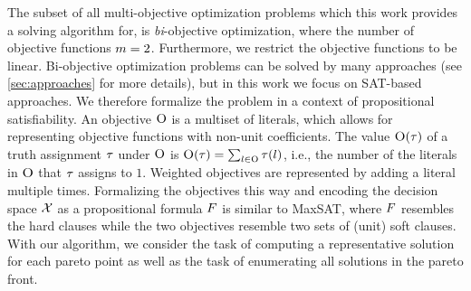 The subset of all multi-objective optimization problems which this work provides a solving algorithm for, is \emph{bi}-objective optimization, where the number of objective functions $m=2$.
Furthermore, we restrict the objective functions to be linear.
Bi-objective optimization problems can be solved by many approaches (see \cref{sec:approaches} for more details), but in this work we focus on SAT-based approaches.
We therefore formalize the problem in a context of propositional satisfiability.
An objective $\textsc{O}$ is a multiset of literals, which allows for representing objective functions with non-unit coefficients.
The value $\textsc{O}(\tau)$ of a truth assignment $\tau$ under $\textsc{O}$ is $\textsc{O}(\tau) = \sum_{l \in \textsc{O}} \tau(l)$, i.e., the number of the literals in $\textsc{O}$ that $\tau$ assigns to $1$. 
Weighted objectives are represented by adding a literal multiple times.
Formalizing the objectives this way and encoding the decision space $\mathcal{X}$ as a propositional formula $F$ is similar to MaxSAT, where $F$ resembles the hard clauses while the two objectives resemble two sets of (unit) soft clauses.
With our algorithm, we consider the task of computing a representative solution for each pareto point as well as the task of enumerating all solutions in the pareto front.

